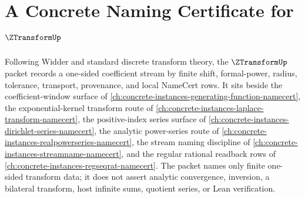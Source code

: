 \chapter{A Concrete Naming Certificate for $\ZTransformUp$}
\label{ch:concrete-instances-z-transform-namecert}

Following Widder and standard discrete transform theory, the $\ZTransformUp$ packet records a one-sided coefficient stream by finite shift, formal-power, radius, tolerance, transport, provenance, and local NameCert rows. It sits beside the coefficient-window surface of \autoref{ch:concrete-instances-generating-function-namecert}, the exponential-kernel transform route of \autoref{ch:concrete-instances-laplace-transform-namecert}, the positive-index series surface of \autoref{ch:concrete-instances-dirichlet-series-namecert}, the analytic power-series route of \autoref{ch:concrete-instances-realpowerseries-namecert}, the stream naming discipline of \autoref{ch:concrete-instances-streamname-namecert}, and the regular rational readback rows of \autoref{ch:concrete-instances-regseqrat-namecert}. The packet names only finite one-sided transform data; it does not assert analytic convergence, inversion, a bilateral transform, host infinite sums, quotient series, or Lean verification.

